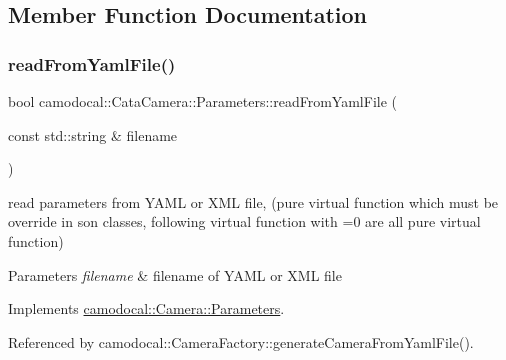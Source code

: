\subsection{Member Function Documentation}
\mbox{\label{classcamodocal_1_1CataCamera_1_1Parameters_a756399dd928f1a0a9b0eb7922361939f}} 
\subsubsection{\texorpdfstring{read\+From\+Yaml\+File()}{readFromYamlFile()}}
{\footnotesize\ttfamily bool camodocal\+::\+Cata\+Camera\+::\+Parameters\+::read\+From\+Yaml\+File (\begin{DoxyParamCaption}\item[{const std\+::string \&}]{filename }\end{DoxyParamCaption})\hspace{0.3cm}{\ttfamily [virtual]}}



read parameters from Y\+A\+ML or X\+ML file, (pure virtual function which must be override in son classes, following virtual function with \textquotesingle{}=0\textquotesingle{} are all pure virtual function) 


\begin{DoxyParams}{Parameters}
{\em filename} & filename of Y\+A\+ML or X\+ML file \\
\hline
\end{DoxyParams}


Implements \hyperlink{classcamodocal_1_1Camera_1_1Parameters_a7968503df2a99e022a0c52bf7dafe531}{camodocal\+::\+Camera\+::\+Parameters}.



Referenced by camodocal\+::\+Camera\+Factory\+::generate\+Camera\+From\+Yaml\+File().

